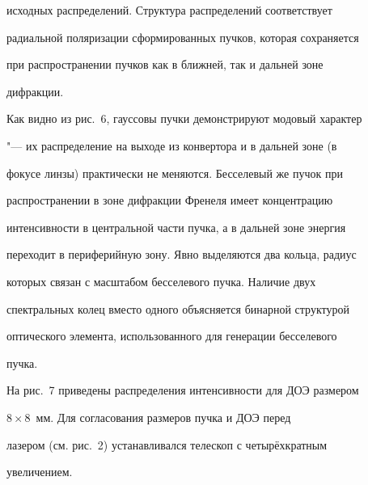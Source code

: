 исходных распределений. Структура распределений соответствует

радиальной поляризации сформированных пучков, которая сохраняется

при распространении пучков как в ближней, так и дальней зоне

дифракции.



Как видно из рис.~6, гауссовы пучки демонстрируют модовый характер

"--- их распределение на выходе из конвертора и в дальней зоне (в

фокусе линзы) практически не меняются. Бесселевый же пучок при

распространении в зоне дифракции Френеля имеет концентрацию

интенсивности в центральной части пучка, а в дальней зоне энергия

переходит в периферийную зону. Явно выделяются два кольца, радиус

которых связан с масштабом бесселевого пучка. Наличие двух

спектральных колец вместо одного объясняется бинарной структурой

оптического элемента, использованного для генерации бесселевого

пучка.



На рис.~7 приведены распределения интенсивности для ДОЭ размером

$8\times 8$~мм. Для согласования размеров пучка и ДОЭ перед

лазером (см. рис.~2) устанавливался телескоп с четырёхкратным

увеличением.











